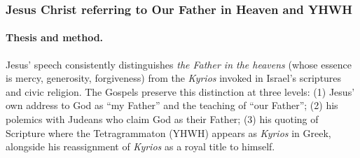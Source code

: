 \subsubsection{Jesus Christ referring to Our Father in Heaven and YHWH}\label{subsubsec:jesus-christ-referring-to-our-father-in-heaven-and-yhwh}

\paragraph{Thesis and method.}
Jesus’ speech consistently distinguishes \emph{the Father in the heavens} (whose essence is mercy, generosity, forgiveness) from the \emph{Kyrios} invoked in Israel’s scriptures and civic religion. The Gospels preserve this distinction at three levels: (1) Jesus’ own address to God as “my Father” and the teaching of “our Father”; (2) his polemics with Judeans who claim God as their Father; (3) his quoting of Scripture where the Tetragrammaton (YHWH) appears as \emph{Kyrios} in Greek, alongside his reassignment of \emph{Kyrios} as a royal title to himself.

